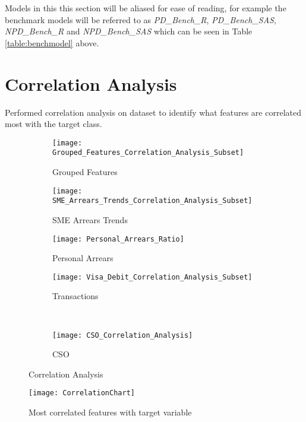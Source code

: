 Models in this this section will be aliased for ease of reading, for example the benchmark models will be referred to as \textit{PD\_Bench\_R}, \textit{PD\_Bench\_SAS}, \textit{NPD\_Bench\_R} and \textit{NPD\_Bench\_SAS} which can be seen in Table \ref{table:benchmodel} above. 


\section{Correlation Analysis}


Performed correlation analysis on dataset to identify what features are correlated most with the target class. 

\begin{figure}[H]
	\centering
	\begin{subfigure}[b]{0.32\textwidth}
		\captionsetup{font=scriptsize}
		\texttt{[image: Grouped\_Features\_Correlation\_Analysis\_Subset]}\caption{Grouped Features}\label{fig:groupedFeaturesCorrelation}
	\end{subfigure} 
	\begin{subfigure}[b]{0.32\textwidth}
		\captionsetup{font=scriptsize}
		\texttt{[image: SME\_Arrears\_Trends\_Correlation\_Analysis\_Subset]}
		\caption{SME Arrears Trends}\label{fig:smeArrearsCorrelation}
	\end{subfigure} 
	\begin{subfigure}[b]{0.32\textwidth}
		\captionsetup{font=scriptsize}
		\texttt{[image: Personal\_Arrears\_Ratio]}
		\caption{Personal Arrears}\label{fig:personalArrearsCorrelation}
	\end{subfigure} 
	\medskip
	\begin{subfigure}[b]{0.32\textwidth}
		\captionsetup{font=scriptsize}
		\texttt{[image: Visa\_Debit\_Correlation\_Analysis\_Subset]}
		\caption{Transactions}\label{fig:transVisaCorrelation}
	\end{subfigure} ~\quad
	\begin{subfigure}[b]{0.32\textwidth}
		\captionsetup{font=scriptsize}
		\texttt{[image: CSO\_Correlation\_Analysis]}
		\caption{CSO}\label{fig:CSOCorrelation}
	\end{subfigure}
	\caption{Correlation Analysis}
	\label{fig:unbal_corr_analysis}
\end{figure}

\begin{figure}[H]
	\texttt{[image: CorrelationChart]}
	\caption{Most correlated features with target variable}
	\label{fig:Correlation Analysis}
\end{figure}


